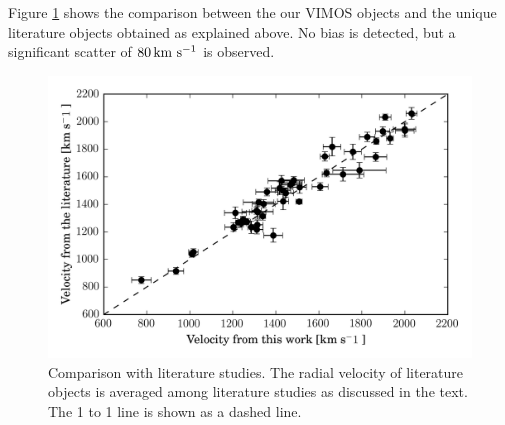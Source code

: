 \documentclass[useAMS,usenatbib]{mn2e}
\newcommand{\kms}{\mbox{\,km~s$^{-1}$}}
\begin{document}
Figure \ref{fig:vel_comparison} shows the comparison between the our VIMOS 
objects and the unique literature objects obtained as explained above. No 
bias is detected, but a significant scatter of $80 \kms$ is observed. 



\begin{figure}
\centering
\includegraphics[width=\columnwidth]{figures/vel_literature.png} 
\caption{Comparison with literature studies. The radial velocity of literature 
objects is averaged among literature studies as discussed in the text. The 1 to 
1 line is shown as a dashed line. }
\label{fig:vel_comparison}
\end{figure}
 
\end{document}
